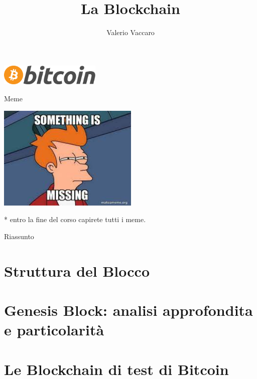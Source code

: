\documentclass[aspectratio=169]{beamer}
\title{La Blockchain}
\author{Valerio Vaccaro}
\date{\displaydate{date}}
\begin{document}
\begin{frame}
    \titlepage
    \begin{center}
        \includegraphics[height=1cm]{logo.png}
    \end{center}
\end{frame}

\begin{frame}[noframenumbering]
    \tableofcontents
\end{frame}

\begin{frame}{Meme}
    \begin{center}
        \includegraphics[height=5cm]{missing.jpg}
    \end{center}
    * entro la fine del corso capirete tutti i meme.
\end{frame}

\begin{frame}{Riassunto}
    
\end{frame}

\section{Struttura del Blocco}

\section{Genesis Block: analisi approfondita e particolarità}

\section{Le Blockchain di test di Bitcoin}



\end{document}
